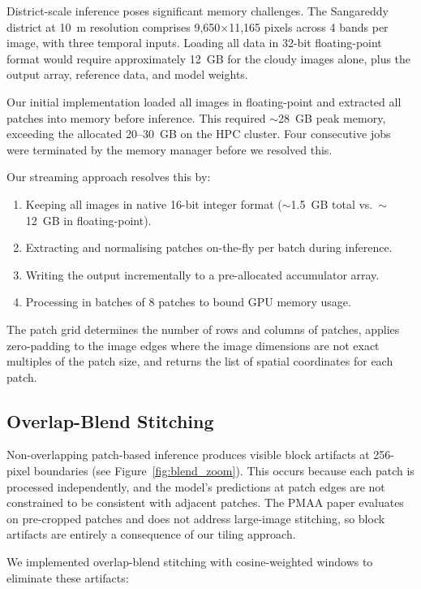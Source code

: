 \documentclass[12pt,a4paper]{article}
\begin{document}
District-scale inference poses significant memory challenges. The Sangareddy district at 10~m resolution comprises 9,650$\times$11,165 pixels across 4 bands per image, with three temporal inputs. Loading all data in 32-bit floating-point format would require approximately 12~GB for the cloudy images alone, plus the output array, reference data, and model weights.

Our initial implementation loaded all images in floating-point and extracted all patches into memory before inference. This required ${\sim}$28~GB peak memory, exceeding the allocated 20--30~GB on the HPC cluster. Four consecutive jobs were terminated by the memory manager before we resolved this.

Our streaming approach resolves this by:

\begin{enumerate}[leftmargin=2em]
    \item Keeping all images in native 16-bit integer format (${\sim}$1.5~GB total vs.\ ${\sim}$12~GB in floating-point).
    \item Extracting and normalising patches on-the-fly per batch during inference.
    \item Writing the output incrementally to a pre-allocated accumulator array.
    \item Processing in batches of 8 patches to bound GPU memory usage.
\end{enumerate}

The patch grid determines the number of rows and columns of patches, applies zero-padding to the image edges where the image dimensions are not exact multiples of the patch size, and returns the list of spatial coordinates for each patch.

\subsection{Overlap-Blend Stitching}

Non-overlapping patch-based inference produces visible block artifacts at 256-pixel boundaries (see Figure~\ref{fig:blend_zoom}). This occurs because each patch is processed independently, and the model's predictions at patch edges are not constrained to be consistent with adjacent patches. The PMAA paper evaluates on pre-cropped patches and does not address large-image stitching, so block artifacts are entirely a consequence of our tiling approach.

We implemented overlap-blend stitching with cosine-weighted windows to eliminate these artifacts:
\end{document}
